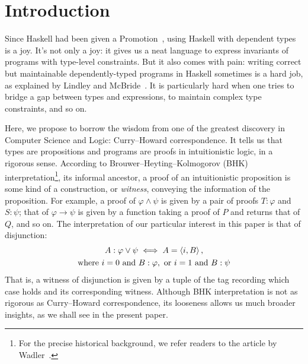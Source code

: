 \documentclass[demotion-paper.tex]{subfiles}
\begin{document}
\section{Introduction}
Since Haskell had been given a Promotion~\cite{Yorgey:2012}, using Haskell with dependent types is a joy.
It's not only a joy: it gives us a neat language to express invariants of programs with type-level constraints.
But it also comes with pain: writing correct but maintainable dependently-typed programs in Haskell sometimes is a hard job, as explained by Lindley and McBride~\cite{10.1145/2503778.2503786}.
It is particularly hard when one tries to bridge a gap between types and expressions, to maintain complex type constraints, and so on.

Here, we propose to borrow the wisdom from one of the greatest discovery in Computer Science and Logic: Curry--Howard correspondence.
It tells us that types are propositions and programs are proofs in intuitionistic logic, in a rigorous sense.
According to Brouwer--Heyting--Kolmogorov (BHK) interpretation\footnote{For the precise historical background, we refer readers to the article by Wadler~\cite{Wadler:2015aa}.}, its informal ancestor, a proof of an intuitionistic proposition is some kind of a construction, or \emph{witness}, conveying the information of the proposition.
For example, a proof of $\varphi \land \psi$ is given by a pair of proofs $T: \varphi$ and $S: \psi$; that of $\varphi \to \psi$ is given by a function taking a proof of $P$ and returns that of $Q$, and so on.
The interpretation of our particular interest in this paper is that of disjunction:
\begin{gather*}
  A: \varphi \vee \psi \iff A = \braket{i, B},
\\
\text{where }
i = 0 \text{ and } B: \varphi, \text{ or }
i = 1 \text{ and } B: \psi
\end{gather*}
That is, a witness of disjunction is given by a tuple of the tag recording which case holds and its corresponding witness.
Although BHK interpretation is not as rigorous as Curry--Howard correspondence, its looseness allows us much broader insights, as we shall see in the present paper.
\end{document}
